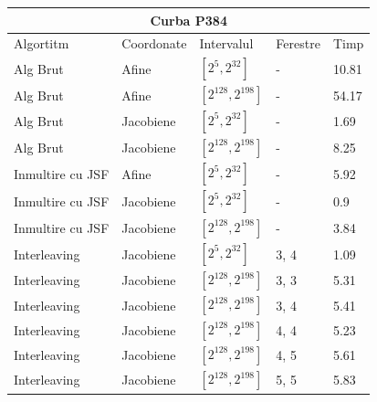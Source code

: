 \begin{tabular}{ |p{5cm}||p{3cm}|p{3cm}|p{2cm}|p{1cm}|  }
 \hline
 \multicolumn{5}{|c|}{Curba P384} \\
  \hline
  Algortitm& Coordonate &Intervalul &Ferestre &Timp\\
 \hline
 Alg Brut & Afine  &$[2^{5},2^{32}]$& - & 10.81\\
 Alg Brut & Afine  &$[2^{128},2^{198}]$& - & 54.17 \\
 Alg Brut & Jacobiene  &$[2^{5},2^{32}]$& - & 1.69 \\
 Alg Brut & Jacobiene  &$[2^{128},2^{198}]$& - & 8.25 \\
 Inmultire cu JSF & Afine  &$[2^{5},2^{32}]$& - & 5.92 \\
 Inmultire cu JSF & Jacobiene  &$[2^{5},2^{32}]$& - & 0.9 \\
 Inmultire cu JSF & Jacobiene  &$[2^{128},2^{198}]$& - & 3.84\\
 Interleaving & Jacobiene  &$[2^{5},2^{32}]$& 3, 4 & 1.09 \\
 Interleaving & Jacobiene  &$[2^{128},2^{198}]$& 3, 3 & 5.31 \\
 Interleaving & Jacobiene  &$[2^{128},2^{198}]$& 3, 4 & 5.41 \\
 Interleaving & Jacobiene  &$[2^{128},2^{198}]$& 4, 4 & 5.23 \\
 Interleaving & Jacobiene  &$[2^{128},2^{198}]$& 4, 5 & 5.61 \\
 Interleaving & Jacobiene  &$[2^{128},2^{198}]$& 5, 5 & 5.83	 \\
 \hline
\end{tabular}



